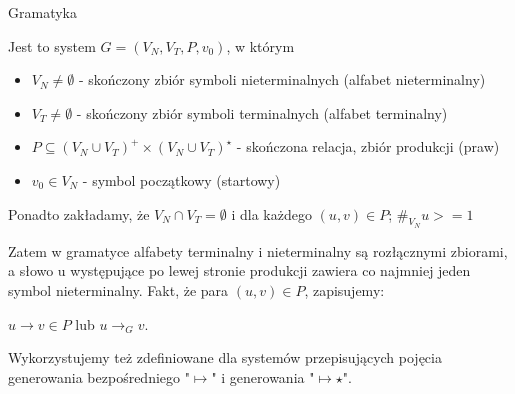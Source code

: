\documentclass[main.tex]{subfiles}
\begin{document}
    \begin{definition}
        Gramatyka

        Jest to system $G=(V_N,V_T,P,v_0)$, w którym
        \begin{itemize}
            \item
            $V_N \ne \emptyset$ - skończony zbiór symboli nieterminalnych (alfabet nieterminalny)
            \item
            $V_T \ne \emptyset$ - skończony zbiór symboli terminalnych (alfabet terminalny)
            \item
            $P \subseteq (V_N \cup V_T)^+ \times (V_N \cup V_T)^\star$ - skończona relacja, zbiór produkcji (praw)
            \item
            $v_0 \in V_N$ - symbol początkowy (startowy)
        \end{itemize}

        Ponadto zakładamy, że $V_N \cap V_T = \emptyset$ i dla każdego
        $(u,v)\in P$; $\#_{V_N} u >= 1$

        Zatem w gramatyce alfabety terminalny i nieterminalny są rozłącznymi zbiorami, a słowo u występujące po lewej stronie produkcji zawiera co najmniej jeden symbol nieterminalny. Fakt, że para $(u,v) \in P$, zapisujemy:

        $u \rightarrow v \in P$ lub $u \rightarrow_G v$.

        Wykorzystujemy też zdefiniowane dla systemów przepisujących pojęcia generowania bezpośredniego "$\mapsto$" i generowania "$\mapsto \star$".
    \end{definition}
\end{document}
